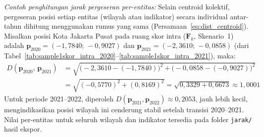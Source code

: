 \label{par:contoh_entity_dist}
\noindent\textit{Contoh penghitungan jarak pergeseran per-entitas:} Selain centroid kolektif, pergeseran posisi setiap entitas (wilayah atau indikator) secara individual antar-tahun dihitung menggunakan rumus yang sama (Persamaan~\ref{eq:dist_centroid}). Misalkan posisi Kota Jakarta Pusat pada ruang skor intra ($\mathbf{F}_k$, Skenario~1) adalah $\mathbf{p}_{2020}=(-1{,}7840;\,-0{,}9027)$ dan $\mathbf{p}_{2021}=(-2{,}3610;\,-0{,}0858)$ (dari Tabel~\ref{tab:sample1skor_intra_2020}--\ref{tab:sample1skor_intra_2021}), maka:
\begin{align*}
  D(\mathbf{p}_{2020},\,\mathbf{p}_{2021})
  &= \sqrt{\bigl(-2{,}3610-(-1{,}7840)\bigr)^2+\bigl(-0{,}0858-(-0{,}9027)\bigr)^2} \\
  &= \sqrt{(-0{,}5770)^2+(0{,}8169)^2}
  = \sqrt{0{,}3329+0{,}6673} \approx 1{,}0001
\end{align*}
Untuk periode 2021--2022, diperoleh $D(\mathbf{p}_{2021},\mathbf{p}_{2022})\approx 0{,}2053$, jauh lebih kecil, mengindikasikan posisi wilayah ini cenderung stabil setelah transisi 2020--2021. Nilai per-entitas untuk seluruh wilayah dan indikator tersedia pada folder \texttt{jarak/} hasil ekspor.

